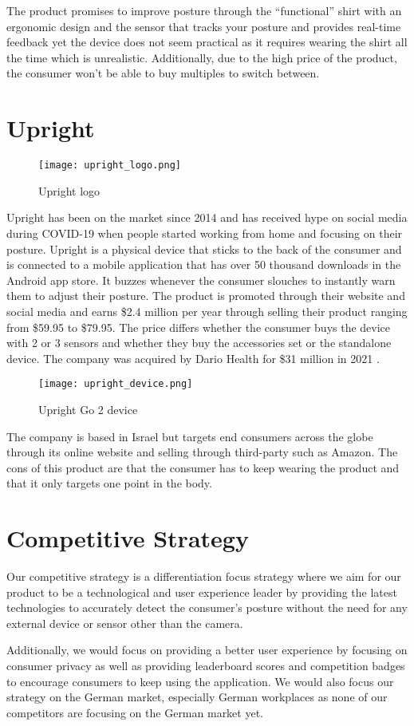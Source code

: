 \p
The product promises to improve posture through the “functional” shirt with an ergonomic design and the sensor that tracks your posture and provides real-time feedback yet the device does not seem practical as it requires wearing the shirt all the time which is unrealistic. Additionally, due to the high price of the product, the consumer won't be able to buy multiples to switch between.

\section{Upright}

\begin{figure}[H]
    \centering
    \texttt{[image: upright\_logo.png]}
    \caption{Upright logo}
    \label{fig:upright_logo}
\end{figure}

Upright has been on the market since 2014 \cite{uprightpose} and has received hype on social media during COVID-19 when people started working from home and focusing on their posture.
Upright is a physical device that sticks to the back of the consumer and is connected to a mobile application that has over 50 thousand downloads in the Android app store.
It buzzes whenever the consumer slouches to instantly warn them to adjust their posture.
The product is promoted through their website and social media and earns \$2.4 million per year through selling their product \cite{upright_growjo} ranging from \$59.95 to \$79.95.
The price differs whether the consumer buys the device with 2 or 3 sensors and whether they buy the accessories set or the standalone device.
The company was acquired by Dario Health for \$31 million in 2021 \cite{dariohealth_acquisition}.

\begin{figure}[H]
    \centering
    \texttt{[image: upright\_device.png]}
    \caption{Upright Go 2 device}
    \label{fig:upright_device}
\end{figure}

The company is based in Israel but targets end consumers across the globe through its online website and selling through third-party such as Amazon. The cons of this product are that the consumer has to keep wearing the product and that it only targets one point in the body.

\section{Competitive Strategy}

Our competitive strategy is a differentiation focus strategy where we aim for our product to be a technological and user experience leader by providing the latest technologies to accurately detect the consumer's posture without the need for any external device or sensor other than the camera. 

\p
Additionally, we would focus on providing a better user experience by focusing on consumer privacy as well as providing leaderboard scores and competition badges to encourage consumers to keep using the application. We would also focus our strategy on the German market, especially German workplaces as none of our competitors are focusing on the German market yet.